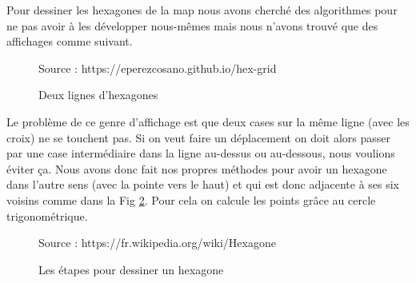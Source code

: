 Pour dessiner les hexagones de la map nous avons cherché des algorithmes pour ne pas avoir à les développer nous-mêmes mais nous n'avons trouvé que des affichages comme suivant.

\begin{figure}[H]
    \centering
    \def\stackalignment{r}
    {\scriptsize%
        Source : https://eperezcosano.github.io/hex-grid}
    \caption{Deux lignes d'hexagones}
    \label{fig:hexmap_exemple}
\end{figure}

Le problème de ce genre d'affichage est que deux cases sur la même ligne (avec les croix) ne se touchent pas. Si on veut faire un déplacement on doit alors passer par une case intermédiaire dans la ligne au-dessus ou au-dessous, nous voulions éviter ça. Nous avons donc fait nos propres méthodes pour avoir un hexagone dans l'autre sens (avec la pointe vers le haut) et qui est donc adjacente à ses six voisins comme dans la Fig \ref{fig:hexagon}. Pour cela on calcule les points grâce au cercle trigonométrique.



\begin{figure}[H]
    \centering
    \def\stackalignment{r}
    {\scriptsize%
        Source : https://fr.wikipedia.org/wiki/Hexagone}
    \caption{Les étapes pour dessiner un hexagone}
    \label{fig:hexagon}
\end{figure}

